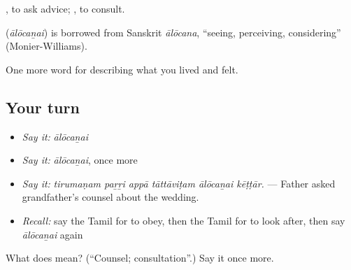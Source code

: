  , to ask advice;  , to consult.

\begin{cousinweb}
\textbf{} (\emph{ālōcaṉai}) is borrowed from Sanskrit \emph{ālōcana}, \textquotedblleft{}seeing, perceiving, considering\textquotedblright{} (Monier-Williams).
\end{cousinweb}

\begin{grammarlens}[title={What you've built}]
One more word for describing what you lived and felt.
\end{grammarlens}

\subsection*{Your turn}
\begin{itemize}
\raggedright
  \item \emph{Say it:} \emph{ālōcaṉai}
  \item \emph{Say it:} \emph{ālōcaṉai}, once more
  \item \emph{Say it:} \emph{tirumaṇam paṟṟi appā tāttāviṭam ālōcaṉai kēṭṭār.} — Father asked grandfather’s counsel about the wedding.
  \item \emph{Recall:} say the Tamil for to obey, then the Tamil for to look after, then say \emph{ālōcaṉai} again
\end{itemize}

\begin{tcolorbox}[breakable,colback=teal!4,colframe=teal!35!black,title={Before you move on}]
What does  mean? (\textquotedblleft{}Counsel; consultation\textquotedblright{}.) Say it once more.
\end{tcolorbox}
